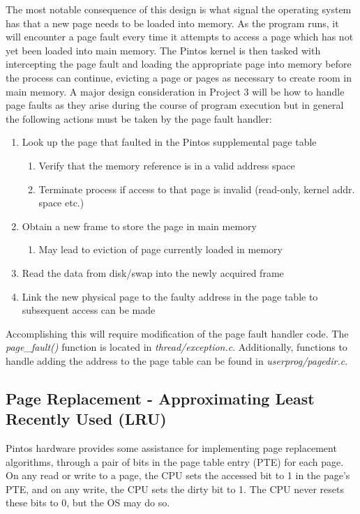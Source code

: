 \documentclass[11pt, letterpaper]{article}
\begin{document}
The most notable consequence of this design is what signal the operating system has that a new page needs to be loaded into memory. As the program runs, it will encounter a page fault every time it attempts to access a page which has not yet been loaded into main memory. The Pintos kernel is then tasked with intercepting the page fault and loading the appropriate page into memory before the process can continue, evicting a page or pages as necessary to create room in main memory. A major design consideration in Project 3 will be how to handle page faults as they arise during the course of program execution but in general the following actions must be taken by the page fault handler:


\begin{enumerate}
\item Look up the page that faulted in the Pintos supplemental page table
\begin{enumerate}
\item Verify that the memory reference is in a valid address space
\item Terminate process if access to that page is invalid (read-only, kernel addr. space etc.)
\end{enumerate}
\item Obtain a new frame to store the page in main memory
\begin{enumerate}
\item May lead to eviction of page currently loaded in memory
\end{enumerate}
\item Read the data from disk/swap into the newly acquired frame
\item Link the new physical page to the faulty address in the page table to subsequent access can be made
\end{enumerate}

Accomplishing this will require modification of the page fault handler code. The\\ \emph{page\_fault()} function is located in \emph{thread/exception.c}. Additionally, functions to handle adding the address to the page table can be found in \emph{userprog/pagedir.c}.


\subsection{Page Replacement - Approximating Least Recently Used (LRU)}
Pintos hardware provides some assistance for implementing page replacement algorithms, through a pair of bits in the page table entry (PTE) for each page. On any read or write to a page, the CPU sets the accessed bit to 1 in the page’s PTE, and on any write, the CPU sets the dirty bit to 1. The CPU never resets these bits to 0, but the OS may do so. 
\end{document}
